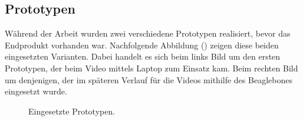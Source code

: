 \subsection{Prototypen}
Während der Arbeit wurden zwei verschiedene Prototypen realisiert, bevor das Endprodukt vorhanden war. Nachfolgende Abbildung () zeigen diese beiden eingesetzten Varianten. Dabei handelt es sich beim links Bild um den ersten Prototypen, der beim Video mittels Laptop zum Einsatz kam. Beim rechten Bild um denjenigen, der im späteren Verlauf für die Videos mithilfe des Beaglebones eingesetzt wurde.

\begin{figure}[H]
  \centering
  \caption{Eingesetzte Prototypen.}
  \label{bPrototypen}
\end{figure}